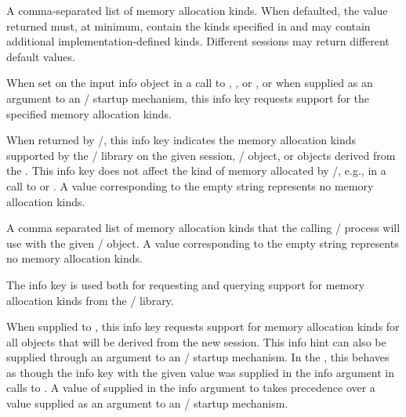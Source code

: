 \begin{description}

{\sloppy %
\item[\infokeymain{mpi\_memory\_alloc\_kinds} (string, default: \infovalskip{mpi,system}):]
A comma-separated list of memory allocation kinds. When defaulted, the value returned
must, at minimum, contain the kinds specified in  and may contain
additional implementation-defined kinds. Different sessions may return different default
values.

When set on the input info object in a call to
        ,
        ,
        or ,
or when supplied as an argument to an \MPI/ startup mechanism, this info key
requests support for the specified memory allocation kinds.

}
%
When returned by \MPI/, this info key indicates the memory allocation kinds
supported by the \MPI/ library on the given session, \MPI/ object, or objects
derived from the \wpm{}.
%
This info key does not affect the kind of memory allocated by \MPI/, e.g., in a
call to  or .
%
A value corresponding to the empty string represents no memory allocation kinds.

\item[\infokeymain{mpi\_assert\_memory\_alloc\_kinds} (string, not set by default):]
A comma separated list of memory allocation kinds that the calling \MPI/ process will
use with the given \MPI/ object.
%
A value corresponding to the empty string represents no memory allocation kinds.

\end{description}

The  info key is used both for requesting
and querying support for memory allocation kinds from the \MPI/ library.

When supplied to , this info key requests support
for memory allocation kinds for all objects that will be derived from the new
session.
%
This info hint can also be supplied through an argument to an \MPI/ startup mechanism.
%
In the \spm{}, this behaves as though the 
info key with the given value was supplied in the info argument in calls to
.
%
A value of  supplied in the info argument to
 takes precedence over a value supplied as an
argument to an \MPI/ startup mechanism.

